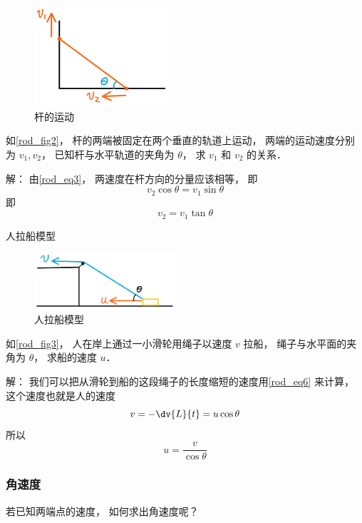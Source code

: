 \begin{exam}{}\label{rod_ex1}
\begin{figure}[ht]
\centering
\includegraphics[width=5cm]{./figures/rod1.png}
\caption{杆的运动} \label{rod_fig1}
\end{figure}
如\autoref{rod_fig2}， 杆的两端被固定在两个垂直的轨道上运动， 两端的运动速度分别为 $v_1, v_2$， 已知杆与水平轨道的夹角为 $\theta$， 求 $v_1$ 和 $v_2$ 的关系．

解： 由\autoref{rod_eq3}， 两速度在杆方向的分量应该相等， 即
\begin{equation}
v_2 \cos\theta = v_1 \sin\theta
\end{equation}
即
\begin{equation}
v_2 = v_1 \tan\theta
\end{equation}
\end{exam}

\begin{exam}{人拉船模型}
\begin{figure}[ht]
\centering
\includegraphics[width=5.3cm]{./figures/rod3.png}
\caption{人拉船模型} \label{rod_fig3}
\end{figure}
如\autoref{rod_fig3}， 人在岸上通过一小滑轮用绳子以速度 $v$ 拉船， 绳子与水平面的夹角为 $\theta$， 求船的速度 $u$．

解： 我们可以把从滑轮到船的这段绳子的长度缩短的速度用\autoref{rod_eq6} 来计算， 这个速度也就是人的速度
\begin{equation}
v = -\dv{L}{t} = u \cos\theta
\end{equation}
所以
\begin{equation}
u = \frac{v}{\cos\theta}
\end{equation}
\end{exam}

\subsubsection{角速度}
若已知两端点的速度， 如何求出角速度呢？

